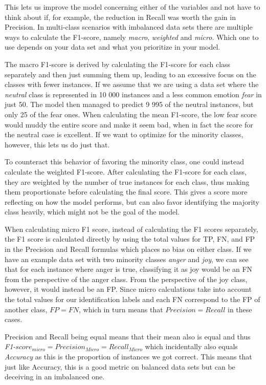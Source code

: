 \documentclass[nofilelist]{cslthse-msc}
\begin{document}
This lets us improve the model concerning either of the variables and not have to think about if, for example, the reduction in Recall was worth the gain in Precision. In multi-class scenarios with imbalanced data sets there are multiple ways to calculate the F1-score, namely \textit{macro}, \textit{weighted} and \textit{micro}. Which one to use depends on your data set and what you prioritize in your model. 

The macro F1-score is derived by calculating the F1-score for each class separately and then just summing them up, leading to an excessive focus on the classes with fewer instances. If we assume that we are using a data set where the \textit{neutral} class is represented in 10 000 instances and a less common emotion \textit{fear} in just 50. The model then managed to predict 9 995 of the neutral instances, but only 25 of the fear ones. When calculating the mean F1-score, the low fear score would muddy the entire score and make it seem bad, when in fact the score for the neutral case is excellent. If we want to optimize for the minority classes, however, this lets us do just that. 

To counteract this behavior of favoring the minority class, one could instead calculate the weighted F1-score. After calculating the F1-score for each class, they are weighted by the number of true instances for each class, thus making them proportionate before calculating the final score. This gives a score more reflecting on how the model performs, but can also favor identifying the majority class heavily, which might not be the goal of the model.

When calculating micro F1 score, instead of calculating the F1 scores separately, the F1 score is calculated directly by using the total values for TP, FN, and FP in the Precision and Recall formulas which places no bias on either class. If we have an example data set with two minority classes \textit{anger} and \textit{joy}, we can see that for each instance where anger is true, classifying it as joy would be an FN from the perspective of the anger class. From the perspective of the joy class, however, it would instead be an FP. Since micro calculations take into account the total values for our identification labels and each FN correspond to the FP of another class, $FP = FN$, which in turn means that $Precision = Recall$ in these cases. 

Precision and Recall being equal means that their mean also is equal and thus \textit{F1-}$score_{micro} = Precision_{Micro} = Recall_{Micro}$ which incidentally also equals \textit{Accuracy} as this is the proportion of instances we got correct. This means that just like Accuracy, this is a good metric on balanced data sets but can be deceiving in an imbalanced one.
\end{document}
